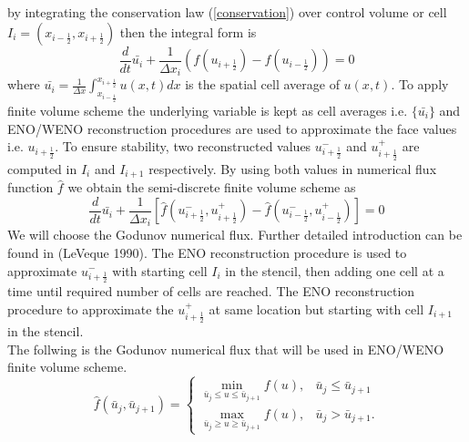 \documentclass{article}
\begin{document}
\noindent by integrating the conservation law (\ref{conservation}) over control volume or cell $I_i = (x_{i - \frac{1}{2}}, x_{i+ \frac{1}{2}} )$ then the integral form is
\begin{equation}
    \frac{d}{dt} \bar{u_i} + \frac{1}{\Delta x_i} \left(  f(u_{i+\frac{1}{2}}) -f(u_{i-\frac{1}{2}} ) \right)= 0
\end{equation}
\noindent where $\bar{u_i} = \frac{1}{\Delta x} \int_{x_{i - \frac{1}{2}}}^{x_{i + \frac{1}{2}}} u(x,t)dx $ is the spatial cell average of $u(x,t)$. To apply finite volume scheme the underlying variable is kept as cell averages i.e. $\{\bar{u_i} \}$ and ENO/WENO reconstruction procedures are used to approximate the face values i.e. $u_{i+\frac{1}{2}}$. To ensure stability, two reconstructed values $u^-_{i+\frac{1}{2}}$ and $u^+_{i + \frac{1}{2}}$ are computed in $I_i$ and $I_{i+1}$ respectively. By using both values in numerical flux function $\hat{f}$ we obtain the semi-discrete finite volume scheme as
\begin{equation}
    \frac{d}{dt} \bar{u_i} + \frac{1}{\Delta x_i} \left[ \hat{f}(u^{-}_{i+\frac{1}{2}},u^{+}_{{i+\frac{1}{2}}}) - \hat{f}(u^-_{i-\frac{1}{2}} , u^+_{i-\frac{1}{2}} ) \right] = 0
\end{equation}
\noindent We will choose the Godunov numerical flux. Further detailed introduction can be found in (LeVeque 1990). The ENO reconstruction procedure is used to approximate $u^-_{i+\frac{1}{2}}$ with starting cell $I_i$ in the stencil, then adding one cell at a time until required number of cells are reached. The ENO reconstruction procedure to approximate the $u^+_{i+\frac{1}{2}}$ at same location but starting with cell $I_{i+1}$ in the stencil.\\

The follwing is the Godunov numerical flux that will be used in ENO/WENO finite volume scheme.
\begin{equation}
\hat{f}(\bar{u}_{j}, \bar{u}_{j+1}) = 
\begin{cases}
\min_{\bar{u}_{j} \leq u \leq \bar{u}_{j+1}} f(u), &\bar{u}_{j} \leq  \bar{u}_{j+1}\\ 
\max_{\bar{u}_{j} \geq u \geq \bar{u}_{j+1}} f(u), &\bar{u}_{j} > \bar{u}_{j+1}.
\end{cases}
\end{equation}
\end{document}
